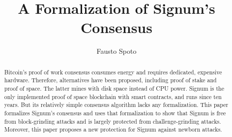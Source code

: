 \documentclass{llncs}
\begin{document}
\begin{frontmatter}

  \title{A Formalization of Signum's Consensus}

  \author{Fausto Spoto}


  \maketitle

  \begin{abstract}
    Bitcoin's proof of work consensus consumes energy and requires
    dedicated, expensive hardware. Therefore, alternatives have been proposed,
    including proof of stake and proof of space. The latter mines with
    disk space instead of CPU power. Signum is the only implemented
    proof of space blockchain with smart contracts, and
    runs since ten years. But its relatively simple
    consensus algorithm lacks any formalization.
    This paper formalizes Signum's consensus and uses that formalization
    to show that Signum is free from block-grinding attacks and is largely
    protected from challenge-grinding attacks. Moreover, this paper proposes
    a new protection for Signum against newborn attacks.
  \end{abstract}

\end{frontmatter}














\end{document}

